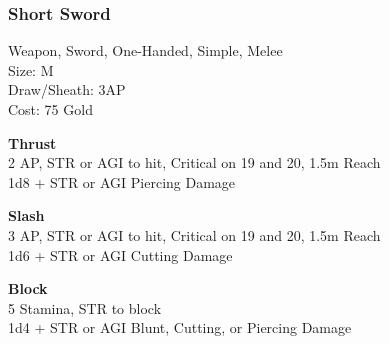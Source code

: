 \subsubsection{Short Sword}\label{weapon:shortSword}
Weapon, Sword, One-Handed, Simple, Melee\\
Size: M\\
Draw/Sheath: 3AP\\
Cost: 75 Gold

\textbf{Thrust}\\
2 AP, STR or AGI to hit, Critical on 19 and 20, 1.5m Reach\\
1d8 + \texttimes STR or AGI Piercing Damage

\textbf{Slash}\\
3 AP, STR or AGI to hit, Critical on 19 and 20, 1.5m Reach\\
1d6 + \texttimes STR or AGI Cutting Damage

\textbf{Block}\\
5 Stamina, STR to block\\
1d4 + \texttimes STR or AGI Blunt, Cutting, or Piercing Damage

